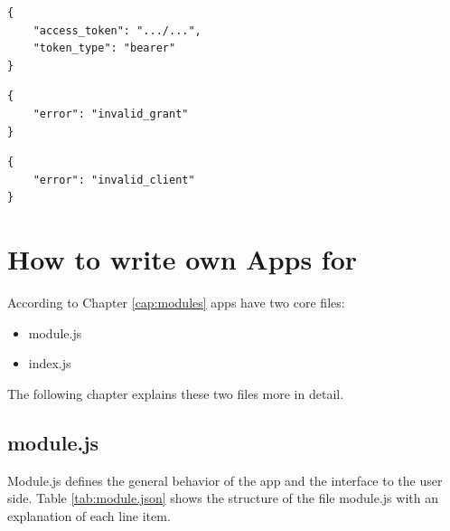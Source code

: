 \begin{lstlisting}[caption=Access token successfuly retrieved,basicstyle=\small,columns=fullflexible]
{
    "access_token": ".../...",
    "token_type": "bearer"
}
\end{lstlisting}

\begin{lstlisting}[caption=Authorization code is invalid (400 Bad request),basicstyle=\small,columns=fullflexible]
{
    "error": "invalid_grant"
}
\end{lstlisting}

\begin{lstlisting}[caption=Wrong credentials (400 Bad request),basicstyle=\small,columns=fullflexible]
{
    "error": "invalid_client"
}
\end{lstlisting}


\section{How to write own Apps for \zway}
\label{developownapps}

According to Chapter \ref{cap:modules} apps have two core files:

\begin{itemize}
\item module.js
\item index.js
\end{itemize}

The following chapter explains these two files more in detail. 

\subsection{module.js}

Module.js defines the general behavior of the app and the interface to the user side.
Table \ref{tab:module.json} 
shows the structure of the file module.js with an explanation of each line item.

